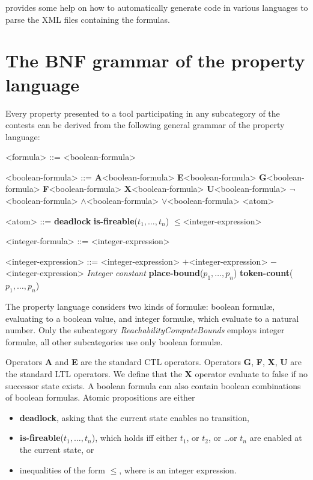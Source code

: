 \documentclass[10pt,english,a4paper]{article}
\newcommand\ctla             {\textbf{A}\xspace}
\newcommand\ctle             {\textbf{E}\xspace}
\newcommand\ltlf             {\textbf{F}\xspace}
\newcommand\ltlg             {\textbf{G}\xspace}
\newcommand\ltlx             {\textbf{X}\xspace}
\newcommand\ltlu             {\textbf{U}\xspace}
\newcommand\logicnot         {\boldmath$\lnot$\xspace}
\newcommand\logicand         {\boldmath$\land$\xspace}
\newcommand\logicor          {\boldmath$\lor$\xspace}
\newcommand\atomleq          {\boldmath$\leq$\xspace}
\newcommand\atomdead         {\textbf{deadlock}\xspace}
\newcommand\atomisfire[1]    {\textbf{is-fireable}(#1)}
\newcommand\atomplacebnd[1]  {\textbf{place-bound}(#1)}
\newcommand\atomtokenscnt[1] {\textbf{token-count}(#1)}
\newcommand\exprplus         {\boldmath$+$\xspace}
\newcommand\exprminus        {\boldmath$-$\xspace}
\begin{document}
 provides some help on how to automatically generate code
in various languages to parse the XML files containing the formulas.

\section{The BNF grammar of the property language}
\label{s:bnf}

Every property presented to a tool participating in any subcategory of the
contests can be derived from the following general grammar of the
property language:

\begin{grammar}
<formula> ::= <boolean-formula>

<boolean-formula> ::= \ctla <boolean-formula>
\alt \ctle <boolean-formula>
\alt \ltlg <boolean-formula>
\alt \ltlf <boolean-formula>
\alt \ltlx <boolean-formula>
 \ltlu <boolean-formula>
\alt \logicnot <boolean-formula>
 \logicand <boolean-formula>
 \logicor <boolean-formula>
\alt <atom>

<atom> ::= \atomdead
\alt \atomisfire{$t_1, \ldots, t_n$}
 \atomleq <integer-expression>

<integer-formula> ::= <integer-expression>

<integer-expression> ::=
     <integer-expression> \exprplus <integer-expression>
 \exprminus <integer-expression>
\alt \textit{Integer constant}
\alt \atomplacebnd{$p_1, \ldots, p_n$}
\alt \atomtokenscnt{$p_1, \ldots, p_n$}

\end{grammar}

The property language considers two kinds of formul\ae{}:
boolean formul\ae{},
evaluating to a boolean value, and integer formul\ae{},
which evaluate to a natural number.
Only the subcategory
\textit{ReachabilityComputeBounds} employs integer formul\ae{}, all other
subcategories use only boolean formul\ae{}.

Operators \ctla and \ctle are the standard CTL operators.
Operators
\ltlg,
\ltlf,
\ltlx,
\ltlu
are the standard LTL operators.
We define that the \ltlx operator evaluate to false if no successor state
exists.  A boolean formula can also contain boolean combinations of boolean
formulas.
Atomic propositions are either
\begin{itemize}
\item
  \atomdead, asking that the current state enables no transition,
\item
  \atomisfire{$t_1, \ldots, t_n$}, which holds iff either $t_1$, or $t_2$,
  or \ldots or $t_n$ are enabled at the current state, or
\item
  inequalities of the form  \atomleq {},
  where  is an integer expression.
\end{itemize}
\end{document}
